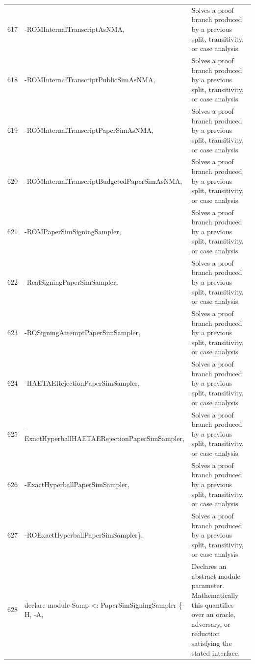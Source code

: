 \documentclass[10pt]{article}
\begin{document}
\begin{longtable}{r L{0.53\textwidth} L{0.37\textwidth}}
617 & {\ttfamily\scriptsize                                     -ROMInternalTranscriptAsNMA,} & Solves a proof branch produced by a previous split, transitivity, or case analysis. \\
618 & {\ttfamily\scriptsize                                     -ROMInternalTranscriptPublicSimAsNMA,} & Solves a proof branch produced by a previous split, transitivity, or case analysis. \\
619 & {\ttfamily\scriptsize                                     -ROMInternalTranscriptPaperSimAsNMA,} & Solves a proof branch produced by a previous split, transitivity, or case analysis. \\
620 & {\ttfamily\scriptsize                                     -ROMInternalTranscriptBudgetedPaperSimAsNMA,} & Solves a proof branch produced by a previous split, transitivity, or case analysis. \\
621 & {\ttfamily\scriptsize                                     -ROMPaperSimSigningSampler,} & Solves a proof branch produced by a previous split, transitivity, or case analysis. \\
622 & {\ttfamily\scriptsize                                     -RealSigningPaperSimSampler,} & Solves a proof branch produced by a previous split, transitivity, or case analysis. \\
623 & {\ttfamily\scriptsize                                     -ROSigningAttemptPaperSimSampler,} & Solves a proof branch produced by a previous split, transitivity, or case analysis. \\
624 & {\ttfamily\scriptsize                                     -HAETAERejectionPaperSimSampler,} & Solves a proof branch produced by a previous split, transitivity, or case analysis. \\
625 & {\ttfamily\scriptsize                                     -ExactHyperballHAETAERejectionPaperSimSampler,} & Solves a proof branch produced by a previous split, transitivity, or case analysis. \\
626 & {\ttfamily\scriptsize                                     -ExactHyperballPaperSimSampler,} & Solves a proof branch produced by a previous split, transitivity, or case analysis. \\
627 & {\ttfamily\scriptsize                                     -ROExactHyperballPaperSimSampler\}.} & Solves a proof branch produced by a previous split, transitivity, or case analysis. \\
628 & {\ttfamily\scriptsize declare module Samp <: PaperSimSigningSampler \{-H, -A,} & Declares an abstract module parameter.  Mathematically this quantifies over an oracle, adversary, or reduction satisfying the stated interface. \\

\end{longtable}
\end{document}
